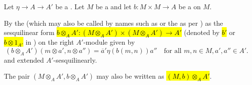\begin{definition} \label{definition:base_change_of_a_sesquilinear_form_on_a_module_over_a_ring_with_involution}
    Let $\eta \to A \to A'$ be a . Let $M$ be a  and let $b: M \times M \to A$ be a  on $M$.


    By the  (which may also be called by names such as  or the  as per ) as the sesquilinear form \hl{$b \otimes_A A': (M \otimes_A A') \times (M \otimes_A A') \to A'$} (denoted by \hl{$b'$} or \hl{$b \otimes 1_{A'}$} in \cite{knus_qhfr}) on the right $A'$-module  given by 
    $$(b \otimes_A A')(m \otimes a', n \otimes a'') = \overline{a} ' \eta(b(m,n)) a'' \quad \text{for all } m,n \in M, a',a'' \in A'.$$
    and extended $A'$-sesquilinearly.

    The pair $(M \otimes_A A', b \otimes_A A')$ may also be written as \hl{$(M, b) \otimes_A A'$}.
\end{definition}
